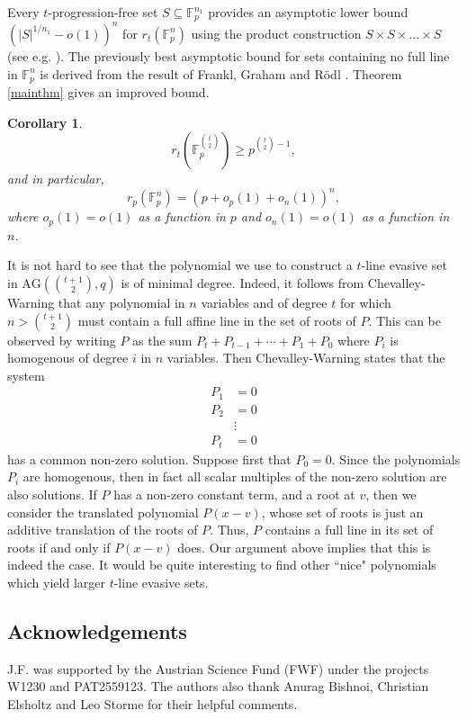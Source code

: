 \documentclass[12pt]{article}
\newtheorem{cor}[thm]{Corollary}
\newcommand{\AG}{\text{AG}}
\begin{document}
 Every $t$-progression-free set $S\subseteq\mathbb{F}_p^{n_1}$ provides an asymptotic lower bound $(|S|^{1/{n_1}}-o(1))^n$ for $r_t(\mathbb{F}_p^n)$ using the product construction $S\times S\times ... \times S$ (see e.g. \cite{Pach22}). The previously best asymptotic bound for sets containing no full line in $\mathbb{F}_p^n$ is derived from the result of Frankl, Graham and R\"odl \cite{FGR}. Theorem \ref{mainthm} gives an improved bound. 


\begin{cor}
$$r_t\left(\mathbb{F}_p^{\binom{t}{2}}\right)\geq p^{\binom{t}{2}-1},$$
and in particular, 
$$r_p\left(\mathbb{F}_p^{n}\right)=\left(p+o_p(1)+o_n(1)\right)^n,$$ where $o_p(1)=o(1)$ as a function in $p$ and $o_n(1)=o(1)$ as a function in $n$.
\end{cor}

It is not hard to see that the polynomial we use to construct a $t$-line evasive set in $\AG(\binom{t+1}{2}, q)$ is of minimal degree. Indeed, it follows from Chevalley-Warning \cite{Chevalley1935, Warning1936} that any polynomial in $n$ variables and of degree $t$ for which $n > \binom{t+1}{2}$ must contain a full affine line in the set of roots of $P$. This can be observed by writing $P$ as the sum $P_t + P_{t-1} + \cdots +P_1 + P_0$ where $P_i$ is homogenous of degree $i$ in $n$ variables. Then Chevalley-Warning states that the system
\begin{eqnarray*}
    P_1 &= 0 \\
    P_2 &= 0 \\
    &\vdots \\
    P_t &= 0
\end{eqnarray*}
has a common non-zero solution. Suppose first that $P_0 = 0$. Since the polynomials $P_i$ are homogenous, then in fact all scalar multiples of the non-zero solution are also solutions. If $P$ has a non-zero constant term, and a root at $v$, then we consider the translated polynomial $P(x - v)$, whose set of roots is just an additive translation of the roots of $P$. Thus, $P$ contains a full line in its set of roots if and only if $P(x - v)$ does. Our argument above implies that this is indeed the case. It would be quite interesting to find other ``nice" polynomials which yield larger $t$-line evasive sets. 

\subsection*{Acknowledgements}

J.F. was supported by the Austrian Science Fund (FWF) under the projects W1230 and PAT2559123. The authors also thank Anurag Bishnoi, Christian Elsholtz and Leo Storme for their helpful comments.


\begingroup
\setlength{\emergencystretch}{2em}
\printbibliography
\endgroup
\end{document}
